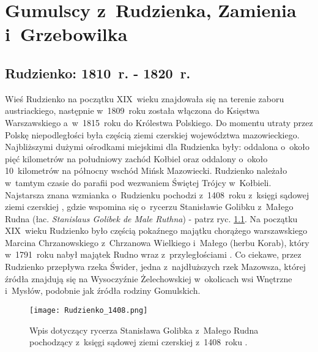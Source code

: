 \chapter{Gumulscy z~Rudzienka, Zamienia i~Grzebowilka}



\section{Rudzienko: 1810~r. - 1820~r.}

Wieś Rudzienko na początku XIX~wieku znajdowała się na terenie zaboru 
austriackiego, następnie w~1809~roku została włączona do Księstwa 
Warszawskiego a~w~1815~roku do Królestwa Polskiego. Do momentu utraty przez 
Polskę niepodległości była częścią ziemi czerskiej województwa mazowieckiego. 
Najbliższymi dużymi ośrodkami miejskimi dla Rudzienka były: oddalona o~około 
pięć kilometrów na południowy zachód Kołbiel oraz oddalony o~około 
10~kilometrów na północny wschód Mińsk Mazowiecki. Rudzienko należało 
w~tamtym czasie do parafii pod wezwaniem Świętej Trójcy w~Kołbieli. Najstarsza  
znana wzmianka o~Rudzienku pochodzi z~1408~roku z~księgi sądowej ziemi 
czerskiej \cite{lzugaj}, gdzie wspomina się o~rycerzu Stanisławie Golibku 
z~Małego Rudna \cite{jlubomirski} (łac. \emph{Stanislaus Golibek de Male 
Ruthna}) - patrz ryc. \ref{fig:rudzienko_1408}. Na początku XIX~wieku 
Rudzienko było częścią pokaźnego majątku chorążego warszawskiego Marcina 
Chrzanowskiego z~Chrzanowa Wielkiego i~Małego (herbu Korab), który 
w~1791~roku nabył majątek Rudno wraz z~przyległościami \cite{dzagorski}. Co 
ciekawe, przez Rudzienko przepływa rzeka Świder, jedna z~najdłuższych rzek 
Mazowsza, której źródła znajdują się na Wysoczyźnie Żelechowskiej w~okolicach 
wsi Wnętrzne i~Mysłów, podobnie jak źródła rodziny Gomulskich.

\begin{figure}[!ht]
    \vspace*{0.5cm}
    \centering \texttt{[image: Rudzienko\_1408.png]}
    \captionsetup{format=hang}
    \caption{Wpis dotyczący rycerza Stanisława Golibka z~Małego Rudna 
    pochodzący z~księgi sądowej ziemi czerskiej z~1408~roku 
    \cite{jlubomirski}.}
    \label{fig:rudzienko_1408}
\end{figure}

